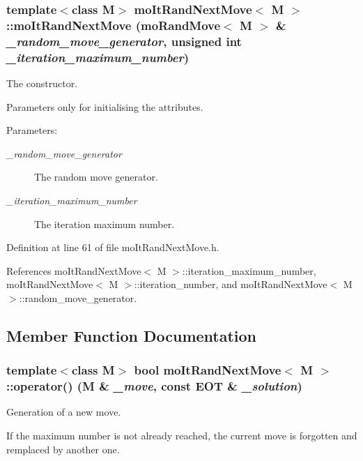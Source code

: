 \subsubsection{\setlength{\rightskip}{0pt plus 5cm}template$<$class M$>$ {\bf mo\-It\-Rand\-Next\-Move}$<$ M $>$::{\bf mo\-It\-Rand\-Next\-Move} ({\bf mo\-Rand\-Move}$<$ M $>$ \& {\em \_\-random\_\-move\_\-generator}, unsigned int {\em \_\-iteration\_\-maximum\_\-number})\hspace{0.3cm}{\tt  [inline]}}\label{classmo_it_rand_next_move_a0}


The constructor. 

Parameters only for initialising the attributes.

\begin{Desc}
\item[Parameters:]
\begin{description}
\item[{\em \_\-random\_\-move\_\-generator}]The random move generator. \item[{\em \_\-iteration\_\-maximum\_\-number}]The iteration maximum number. \end{description}
\end{Desc}


Definition at line 61 of file mo\-It\-Rand\-Next\-Move.h.

References mo\-It\-Rand\-Next\-Move$<$ M $>$::iteration\_\-maximum\_\-number, mo\-It\-Rand\-Next\-Move$<$ M $>$::iteration\_\-number, and mo\-It\-Rand\-Next\-Move$<$ M $>$::random\_\-move\_\-generator.

\subsection{Member Function Documentation}
\subsubsection{\setlength{\rightskip}{0pt plus 5cm}template$<$class M$>$ bool {\bf mo\-It\-Rand\-Next\-Move}$<$ M $>$::operator() (M \& {\em \_\-move}, const {\bf EOT} \& {\em \_\-solution})\hspace{0.3cm}{\tt  [inline]}}\label{classmo_it_rand_next_move_a1}


Generation of a new move. 

If the maximum number is not already reached, the current move is forgotten and remplaced by another one.

